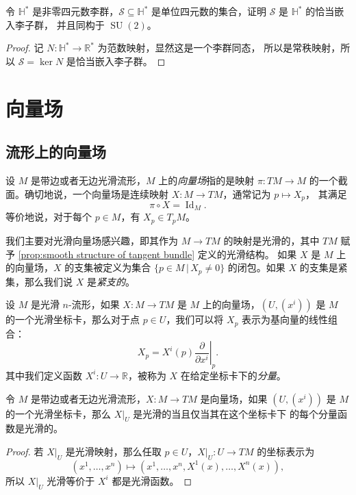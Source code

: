 \documentclass[fontset=none]{Notes}
\DeclareMathOperator\SU{SU}
\DeclareMathOperator\Id{Id}
\begin{document}
\begin{problem}{}{}
  令 $\mathbb{H}^*$ 是非零四元数李群，$\mathcal{S}\subseteq \mathbb{H}^*$
  是单位四元数的集合，证明 $\mathcal{S}$ 是 $\mathbb{H}^*$ 的恰当嵌入李子群，
  并且同构于 $\SU(2)$。
\end{problem}
\begin{proof}
  记 $N:\mathbb{H}^*\to \mathbb{R}^*$ 为范数映射，显然这是一个李群同态，
  所以是常秩映射，所以 $\mathcal{S}=\ker N$ 是恰当嵌入李子群。
\end{proof}



\chapter{向量场}

\section{流形上的向量场}

设 $M$ 是带边或者无边光滑流形，$M$ 上的\emph{向量场}指的是映射 $\pi:TM\to M$
的一个截面。确切地说，一个向量场是连续映射 $X:M\to TM$，通常记为 $p\mapsto X_p$，
其满足
\[
  \pi\circ X=\Id_M.
\]
等价地说，对于每个 $p\in M$，有 $X_p\in T_pM$。

我们主要对光滑向量场感兴趣，即其作为 $M\to TM$ 的映射是光滑的，其中 $TM$
赋予 \autoref{prop:smooth structure of tangent bundle} 定义的光滑结构。
如果 $X$ 是 $M$ 上的向量场，$X$ 的支集被定义为集合 $\{p\in M\,|\, X_p\neq 0\}$
的闭包。如果 $X$ 的支集是紧集，那么我们说 $X$ 是\emph{紧支的}。

设 $M$ 是光滑 $n$-流形，如果 $X:M\to TM$ 是 $M$ 上的向量场，$(U,(x^i))$
是 $M$ 的一个光滑坐标卡，那么对于点 $p\in U$，我们可以将 $X_p$
表示为基向量的线性组合：
\begin{equation}\label{eq:value of vector field}
  X_p=X^i(p)\left.\frac{\partial}{\partial x^i}\right|_p.
\end{equation}
其中我们定义函数 $X^i:U\to \mathbb{R}$，被称为 $X$ 在给定坐标卡下的\emph{分量}。

\begin{proposition}[向量场的光滑性判别]
  令 $M$ 是带边或者无边光滑流形，$X:M\to TM$ 是向量场，如果 $(U,(x^i))$
  是 $M$ 的一个光滑坐标卡，那么 $X|_U$ 是光滑的当且仅当其在这个坐标卡下
  的每个分量函数是光滑的。
\end{proposition}
\begin{proof}
  若 $X|_U$ 是光滑映射，那么任取 $p\in U$，$X|_U:U\to TM$ 的坐标表示为
  \[
    \left(x^1,\dots,x^n\right)\mapsto \left(x^1,\dots,x^n,X^1(x),\dots,X^n(x)\right),
  \]
  所以 $X|_U$ 光滑等价于 $X^i$ 都是光滑函数。
\end{proof}
\end{document}

